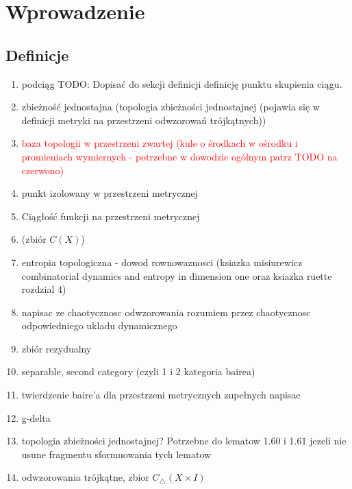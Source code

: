 \documentclass[licencjacka]{pwr_wmat_praca_dyplomowa}
\theoremstyle{plain}
\numberwithin{theorem}{chapter}
\theoremstyle{definition}
\numberwithin{theorem}{chapter}
\begin{document}
\chapter{Wprowadzenie}

\section{Definicje}



\begin{enumerate}

\item podciąg
TODO: Dopisać do sekcji definicji definicję punktu skupienia ciągu.

\item zbieżność jednostajna (topologia zbieżności jednostajnej (pojawia się w definicji metryki na przestrzeni odwzorowań trójkątnych))



\item \textcolor{red}{baza topologii w przestrzeni zwartej (kule o środkach w ośrodku i promieniach wymiernych - potrzebne w dowodzie ogólnym patrz TODO na czerwono)}
\item punkt izolowany w przestrzeni metrycznej


\item Ciągłość funkcji na przestrzeni metrycznej 
\item (zbiór $C(X)$)






\item entropia topologiczna - dowod rownowaznosci (ksiazka misiurewicz combinatorial dynamics and entropy in dimension one oraz ksiazka ruette rozdzial 4)



\item napisac ze chaotycznosc odwzorowania rozumiem przez chaotycznosc odpowiedniego ukladu dynamicznego

\item zbiór rezydualny
\item separable, second category (czyli 1 i 2 kategoria bairea)
\item twierdzenie baire'a dla przestrzeni metrycznych zupełnych napisac
\item g-delta
\item topologia zbieżności jednostajnej? Potrzebne do lematow 1.60 i 1.61 jezeli nie usune fragmentu sformuowania tych lematow




\item odwzorowania trójkątne, zbior $C_\triangle(X \times I)$

\end{enumerate}
\end{document}
